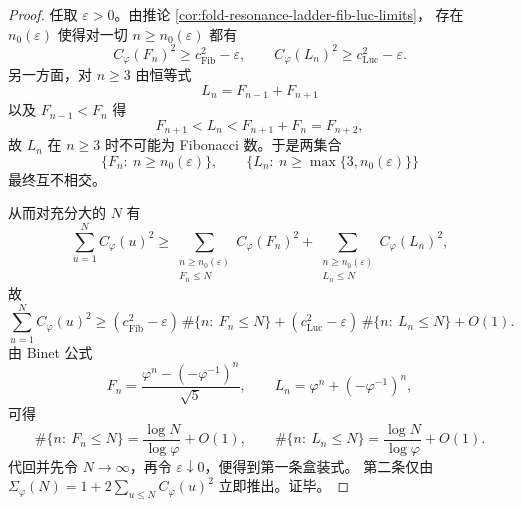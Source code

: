 \begin{proof}
任取 \(\varepsilon>0\)。由推论 \ref{cor:fold-resonance-ladder-fib-luc-limits}，
存在 \(n_0(\varepsilon)\) 使得对一切 \(n\ge n_0(\varepsilon)\) 都有
\[
C_\varphi(F_n)^2\ge c_{\mathrm{Fib}}^2-\varepsilon,
\qquad
C_\varphi(L_n)^2\ge c_{\mathrm{Luc}}^2-\varepsilon.
\]
另一方面，对 \(n\ge 3\) 由恒等式
\[
L_n=F_{n-1}+F_{n+1}
\]
以及 \(F_{n-1}<F_n\) 得
\[
F_{n+1}<L_n<F_{n+1}+F_n=F_{n+2},
\]
故 \(L_n\) 在 \(n\ge 3\) 时不可能为 Fibonacci 数。于是两集合
\[
\{F_n:\ n\ge n_0(\varepsilon)\},
\qquad
\{L_n:\ n\ge \max\{3,n_0(\varepsilon)\}\}
\]
最终互不相交。

从而对充分大的 \(N\) 有
\[
\sum_{u=1}^{N}C_\varphi(u)^2
\ge
\sum_{\substack{n\ge n_0(\varepsilon)\\ F_n\le N}}C_\varphi(F_n)^2
+
\sum_{\substack{n\ge n_0(\varepsilon)\\ L_n\le N}}C_\varphi(L_n)^2,
\]
故
\[
\sum_{u=1}^{N}C_\varphi(u)^2
\ge
(c_{\mathrm{Fib}}^2-\varepsilon)\,\#\{n:\ F_n\le N\}
+
(c_{\mathrm{Luc}}^2-\varepsilon)\,\#\{n:\ L_n\le N\}
+O(1).
\]
由 Binet 公式
\[
F_n=\frac{\varphi^n-(-\varphi^{-1})^n}{\sqrt5},
\qquad
L_n=\varphi^n+(-\varphi^{-1})^n,
\]
可得
\[
\#\{n:\ F_n\le N\}=\frac{\log N}{\log\varphi}+O(1),
\qquad
\#\{n:\ L_n\le N\}=\frac{\log N}{\log\varphi}+O(1).
\]
代回并先令 \(N\to\infty\)，再令 \(\varepsilon\downarrow 0\)，便得到第一条盒装式。
第二条仅由 \(\Sigma_\varphi(N)=1+2\sum_{u\le N}C_\varphi(u)^2\) 立即推出。证毕。
\end{proof}

